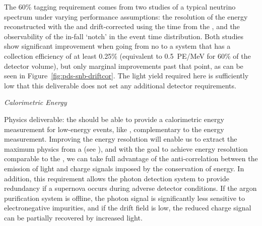 The 60\% \tzero tagging requirement comes from two studies of a typical  neutrino spectrum under varying  performance assumptions: the resolution of the energy reconstructed with the  and drift-corrected using the time from the , and the observability of the in-fall `notch' in the  event time distribution. Both studies show significant improvement when going from no  to a system that has a collection efficiency of at least 0.25\% (equivalent to \SI{0.5}{PE/MeV} for 60\% of the detector volume), but only marginal improvements past that point, as can be seen in Figure~\ref{fig:pds-snb-driftcor}. The light yield required here is sufficiently low that this deliverable does not set any additional detector requirements.


\textit{Calorimetric Energy}\nopagebreak

Physics deliverable: the  should be able to provide a calorimetric energy measurement for low-energy events, like , complementary to the  energy measurement. 
Improving the energy resolution will enable us to extract the maximum physics from a  (see \physchsnb{}), and with the goal to achieve energy resolution comparable to the , we can take full advantage of the anti-correlation between the emission of light and charge signals imposed by the conservation of energy. In addition, this requirement allows the photon detection system to provide redundancy if a supernova occurs during adverse detector conditions. If the argon purification system is offline, the photon signal is significantly less sensitive to electronegative impurities, and if the drift field is low, the reduced charge signal can be partially recovered by increased light.


